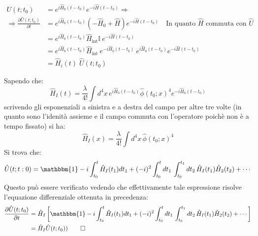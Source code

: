 \documentclass[]{article}
\begin{document}
\begin{align}
  U(t; t_0) &= e^{i\hat H_0 (t-t_0)}e^{-i\hat H (t-t_0)} \Rightarrow\\
 \Rightarrow \frac{\partial \hat U (t;t_0)}{\partial t} &= e^{i \hat H_0(t-t_0)} \left(-\hat H_0 + \hat H \right) e^{-i \hat H (t-t_0)} \quad \text{In quanto $\hat H$ commuta con $\hat U$ }\\
  &=e^{i \hat H_0(t-t_0)} \hat H_\text{int} \mathbb{I} \:  e^{-i \hat H(t-t_0)}\\
  &= e^{i \hat H_0(t-t_0)} \hat H_\text{int} \: e^{-i \hat H_0(t-t_0)} \: e^{i \hat H_0(t-t_0)} e^{-i \hat H(t-t_0)}\\
  &=\hat H_i(t) \; \hat U(t;t_0)
\end{align}

Sapendo che:
\begin{equation}
 \hat H_I(t) = \frac{\lambda}{4!} \int d^4 x \, e^{i \hat H_0(t-t_0)} \hat \phi(t_0; x)^4 e^{-i \hat H_0(t-t_0)}
\end{equation}
scrivendo gli esponenziali a sinistra e a destra del campo per altre tre volte (in quanto sono l'idenità assieme e il campo commuta con l'operatore poichè non è a tempo fissato) si ha:
\begin{equation}
 \hat H_I ( x) = \frac{\lambda}{4!} \int d^4 x \, \hat \phi(t_0; x)^4
\end{equation}
Si trova che:
\begin{equation}
  \hat U(t;t:0) = \mathbbm{1} - i\int^t_{t_0} \hat H_I (t_1) dt_1 + (-i)^2 \int^t_{t_0}dt_1 \, \int_{t_0}^{t_1} dt_2 \, \hat H_I (t_1) \hat H_2 (t_2) + \cdots
  \end{equation}
Questo può essere verificato vedendo che effettivamente tale espressione risolve l'equazione differenziale ottenuta in precedenza:
\begin{align}
 \frac{\partial \hat U (t;t_0)}{\partial t} &= \hat H_I \left[ \mathbbm{1} - i\int^t_{t_0} \hat H_I (t_1) dt_1 + (-i)^2 \int^t_{t_0}dt_1 \, \int_{t_0}^{t_1} dt_2 \, \hat H_I (t_1) \hat H_2 (t_2) + \cdots \right] \\ & = \hat H_I \hat U(t;t_0)) \qquad \square
\end{align}
\end{document}
